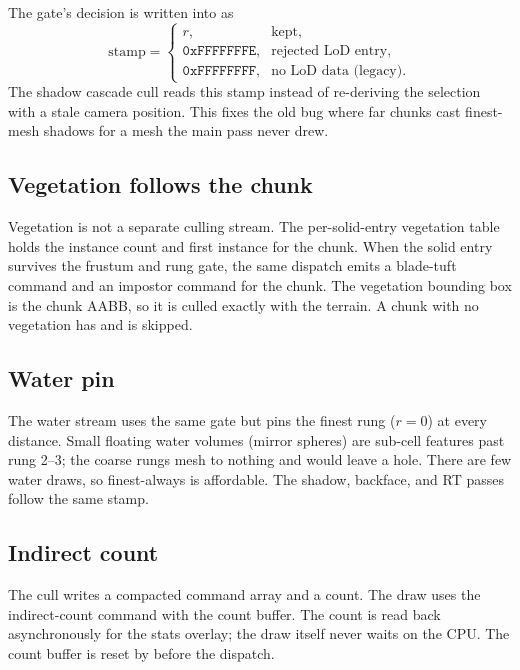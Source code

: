 The gate's decision is written into  as
\begin{equation}
  \text{stamp} =
  \begin{cases}
    r, & \text{kept},\\
    \texttt{0xFFFFFFFE}, & \text{rejected LoD entry},\\
    \texttt{0xFFFFFFFF}, & \text{no LoD data (legacy)}.
  \end{cases}
\end{equation}
The shadow cascade cull reads this stamp instead of re-deriving the
selection with a stale camera position.  This fixes the old bug where far
chunks cast finest-mesh shadows for a mesh the main pass never drew.

\subsection{Vegetation follows the chunk}

Vegetation is not a separate culling stream.  The per-solid-entry
vegetation table holds the instance count and first instance for the
chunk.  When the solid entry survives the frustum and rung gate, the same
dispatch emits a blade-tuft command and an impostor command for the chunk.
The vegetation bounding box is the chunk AABB, so it is culled exactly with
the terrain.  A chunk with no vegetation has  and is
skipped.

\subsection{Water pin}

The water stream uses the same gate but pins the finest rung
($r=0$) at every distance.  Small floating water volumes (mirror spheres)
are sub-cell features past rung 2--3; the coarse rungs mesh to nothing and
would leave a hole.  There are few water draws, so finest-always is
affordable.  The shadow, backface, and RT passes follow the same stamp.

\subsection{Indirect count}

The cull writes a compacted command array and a count.  The draw uses the
indirect-count command with the count buffer.  The count is
read back asynchronously for the stats overlay; the draw itself never
waits on the CPU.  The count buffer is reset by 
before the dispatch.
